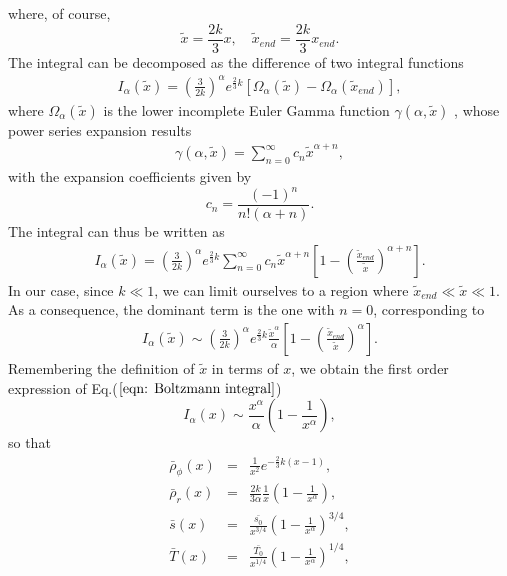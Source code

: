 \documentclass[%
aps,prd,nofootinbib,showkeys,a4paper,10pt
]{revtex4-2}
\begin{document}
where, of course,
\begin{equation}
\tilde{x}=\frac{2k}{3} x,\quad \tilde{x}_{end}=\frac{2k}{3}x_{end}.
\end{equation}
The integral can be decomposed as the difference of two integral functions \cite{28}
\begin{eqnarray}
I_{\alpha}(\tilde{x})=\left(\frac{3}{2k}\right)^{\alpha}e^{\frac{2}{3}k}\left[\Omega_{\alpha}(\tilde{x}) - \Omega_{\alpha}(\tilde{x}_{end})\right],
\end{eqnarray}
where $\Omega_{\alpha}(\tilde{x})$ is the lower incomplete Euler Gamma function $\gamma(\alpha, \tilde{x})$ \cite{49}, 
whose power series expansion results
\begin{eqnarray}
\gamma(\alpha, \tilde{x})=\sum_{n=0}^{\infty} c_n \tilde{x}^{\alpha+n}  ,
\end{eqnarray}
with the expansion coefficients given by 
\begin{equation}
c_n=\frac{(-1)^n}{n!(\alpha+n)}.
\end{equation}
The integral can thus be written as 
\begin{eqnarray}
I_{\alpha}(\tilde{x})=\left(\frac{3}{2k}\right)^{\alpha}e^{\frac{2}{3}k}\sum_{n=0}^{\infty}c_{n}\tilde{x}^{\alpha+n}
\left[ 1-\left(\frac{\tilde{x}_{end}}{\tilde{x}}\right)^{\alpha + n} \right] .
\end{eqnarray}
In our case, since $k\ll1$, we can limit ourselves to a region  where $\tilde{x}_{end}\ll \tilde{x} \ll 1$. 
As a consequence, the dominant term is the one with $n=0$, corresponding to
\begin{eqnarray}
I_{\alpha}(\tilde{x})\sim \left(\frac{3}{2k}\right)^{\alpha}e^{\frac{2}{3}k} \frac{\tilde{x}^{\alpha}}{\alpha}\left[ 1-\left(\frac{\tilde{x}_{end}}{\tilde{x}}\right)^{\alpha} \right].
\end{eqnarray}
Remembering the definition of $\tilde{x}$ in terms of $x$, we obtain the first order expression of Eq.($\ref{eqn: Boltzmann integral}$)
\begin{equation}
I_{\alpha}(x)\sim \frac{x^{\alpha}}{\alpha}\left(1-\frac{1}{x^{\alpha}}\right) ,
\end{equation}
so that 
\begin{eqnarray}\label{eqn:generalsystem4}
\bar{\rho}_{\phi}(x)&=& \frac{1}{x^2}e^{-\frac{2}{3}k(x-1)},\\
\bar{\rho}_r(x)&=& \frac{2k}{3\alpha}\frac{1}{x}\left(1-\frac{1}{x^{\alpha}}\right),\\
\bar{s}(x)&=&  \frac{\bar{s_0}}{x^{3/4}}\left(1-\frac{1}{x^{\alpha}}\right)^{3/4},\\
\bar{T}(x)&=&  \frac{\bar{T_0}}{x^{1/4}}\left(1-\frac{1}{x^{\alpha}}\right)^{1/4},
\end{eqnarray}
\end{document}
